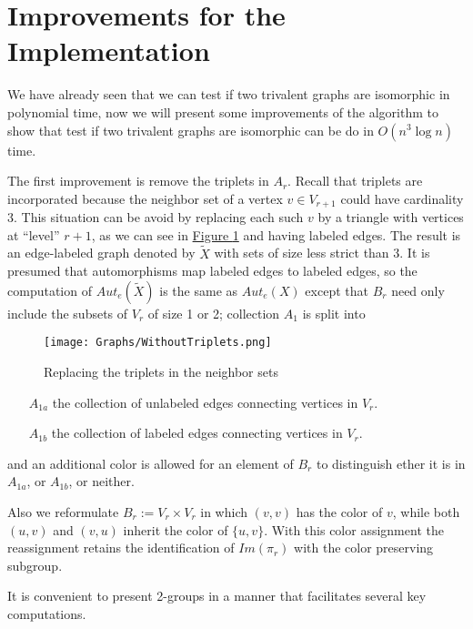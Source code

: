 \documentclass[12pt,a4paper]{book}
\theoremstyle{plain}
\theoremstyle{definition}
\theoremstyle{remark}
\begin{document}
 \section{Improvements for the Implementation}

 We have already seen that we can test if two trivalent graphs are isomorphic in polynomial time, now we will present some improvements of the 
algorithm to show that test if two trivalent graphs are isomorphic  can be do in $O( n^3 \log n)$ time.

The first improvement is remove the triplets in $A_r$. Recall that triplets are incorporated because the neighbor set of a vertex $v \in V_{r+1}$ 
could have cardinality 3. This situation can be avoid by replacing each such $v$ by a triangle with vertices at ``level'' $r+1$, as we can see 
in \hyperlink{Triplets}{Figure \ref{Triplets}} and having labeled edges. The result is an edge-labeled graph denoted by $\tilde{X}$ with sets 
of size less strict than 3. It is presumed that automorphisms map labeled edges to labeled edges, so the computation of $Aut_e(\tilde{X})$ is
 the same as $Aut_e(X)$ except that $B_r$ need only include the subsets of $V_r$ of size 1 or 2; collection $A_1$ is split into 

 \begin{figure}\label{Triplets}\hypertarget{Triplets}{ }
   \centering
    \texttt{[image: Graphs/WithoutTriplets.png]}
   \caption{Replacing the triplets in the neighbor sets}
 
\end{figure}

\begin{itemize}
 \item[$A_{1a}$] the collection of unlabeled edges connecting vertices in $V_r$. 
 \item[$A_{1b}$] the collection of labeled edges connecting vertices in $V_r$.
\end{itemize}

and an additional color is allowed for an element of $B_r$ to distinguish ether it is in $A_{1a}$, or $A_{1b}$, or neither. 

Also we reformulate $B_r := V_r \times V_r$ in which $(v,v)$ has the color of $v$, while both $(u,v)$ and $(v,u)$ inherit the color of 
$\{u,v\}$. With this color assignment the reassignment retains the identification of $Im(\pi_r)$ with the color preserving subgroup.

It is convenient to present 2-groups in a manner that facilitates several key computations.
\end{document}
